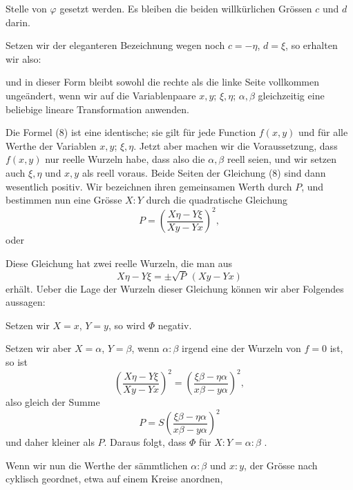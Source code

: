 Stelle von $\varphi$ gesetzt werden. Es bleiben die beiden willkürlichen
Grössen $c$ und $d$ darin.

Setzen wir der eleganteren Bezeichnung wegen noch $c = -\eta$,
$d = \xi$, so erhalten wir also:


und in dieser Form bleibt sowohl die rechte als die linke Seite
vollkommen ungeändert, wenn wir auf die Variablenpaare $x, y$;
$\xi, \eta$; $\alpha, \beta$ gleichzeitig eine beliebige lineare Transformation
anwenden.

Die Formel (8) ist eine identische; sie gilt für jede Function
$f(x, y)$ und für alle Werthe der Variablen $x, y$; $\xi, \eta$. Jetzt aber
machen wir die Voraussetzung, dass $f(x, y)$ nur reelle Wurzeln habe,
dass also die $\alpha, \beta$ reell seien, und wir setzen auch $\xi, \eta$ und
$x, y$ als reell voraus. Beide Seiten der Gleichung (8) sind dann
wesentlich positiv. Wir bezeichnen ihren gemeinsamen Werth durch
$P$, und bestimmen nun eine Grösse $X:Y$ durch die quadratische
Gleichung
\[
P = \left(\frac{X\eta - Y\xi}{Xy - Yx}\right)^2,
\]
oder


Diese Gleichung hat zwei reelle Wurzeln, die man aus
\[
X\eta - Y\xi = \pm \sqrt{P}\,(Xy - Yx)
\]
erhält. Ueber die Lage der Wurzeln dieser Gleichung können wir aber
Folgendes aussagen:

Setzen wir $X = x$, $Y = y$, so wird $\Phi$ negativ.

Setzen wir aber $X = \alpha$, $Y = \beta$, wenn $\alpha:\beta$ irgend eine
der Wurzeln von $f = 0$ ist, so ist
\[
\left(\frac{X\eta - Y\xi}{Xy - Yx}\right)^2 = \left(\frac{\xi\beta - \eta\alpha}{x\beta - y\alpha}\right)^2,
\]
also gleich  der Summe
\[
P = S\left(\frac{\xi\beta - \eta\alpha}{x\beta - y\alpha}\right)^2
\]
und daher kleiner als $P$. Daraus folgt, dass $\Phi$ für $X:Y = \alpha:\beta$
.

Wenn wir nun die Werthe der sämmtlichen $\alpha:\beta$ und $x:y$, der
Grösse nach cyklisch geordnet, etwa auf einem Kreise anordnen,
